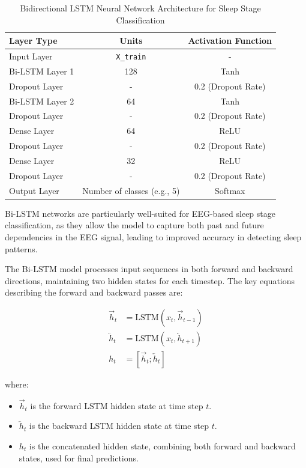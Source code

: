 \begin{table}[!h]
	\centering
	\caption{Bidirectional LSTM Neural Network Architecture for Sleep Stage Classification}
	\label{tab:bi_lstm_architecture}
	\begin{tabular}{lcc}
		\hline
		\textbf{Layer Type} & \textbf{Units} & \textbf{Activation Function} \\
		\hline
		Input Layer         & \texttt{X\_train}            & - \\
		Bi-LSTM Layer 1     & 128                          & Tanh \\
		Dropout Layer       & -                            & 0.2 (Dropout Rate) \\
		Bi-LSTM Layer 2     & 64                           & Tanh \\
		Dropout Layer       & -                            & 0.2 (Dropout Rate) \\
		Dense Layer         & 64                           & ReLU \\
		Dropout Layer       & -                            & 0.2 (Dropout Rate) \\
		Dense Layer         & 32                           & ReLU \\
		Dropout Layer       & -                            & 0.2 (Dropout Rate) \\
		Output Layer        & Number of classes (e.g., 5)  & Softmax \\
		\hline
	\end{tabular}
\end{table}

Bi-LSTM networks are particularly well-suited for EEG-based sleep stage classification, as they allow the model to capture both past and future dependencies in the EEG signal, leading to improved accuracy in detecting sleep patterns.

The Bi-LSTM model processes input sequences in both forward and backward directions, maintaining two hidden states for each timestep. The key equations describing the forward and backward passes are:

\begin{align}
	\overrightarrow{h}_t &= \text{LSTM}(x_t, \overrightarrow{h}_{t-1}) \\
	\overleftarrow{h}_t &= \text{LSTM}(x_t, \overleftarrow{h}_{t+1}) \\
	h_t &= [\overrightarrow{h}_t; \overleftarrow{h}_t]
\end{align}

where:
\begin{itemize}
	\item \( \overrightarrow{h}_t \) is the forward LSTM hidden state at time step \( t \).
	\item \( \overleftarrow{h}_t \) is the backward LSTM hidden state at time step \( t \).
	\item \( h_t \) is the concatenated hidden state, combining both forward and backward states, used for final predictions.
\end{itemize}




